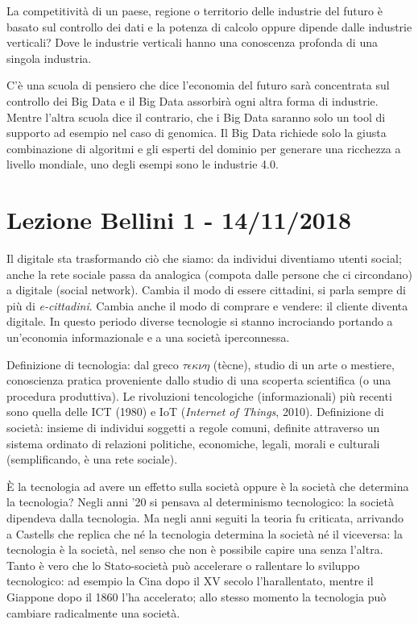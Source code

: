 \documentclass[a4page, 11pt]{article}
\begin{document}
La competitività di un paese, regione o territorio delle industrie del futuro è basato sul controllo dei dati e la potenza di calcolo oppure dipende dalle industrie verticali? Dove le industrie verticali hanno una conoscenza profonda di una singola industria.
 
C’è una scuola di pensiero che dice l’economia del futuro sarà concentrata sul controllo dei Big Data e il Big Data assorbirà ogni altra forma di industrie. Mentre l’altra scuola dice il contrario, che i Big Data saranno solo un tool di supporto ad esempio nel caso di genomica. Il Big Data richiede solo la giusta combinazione di algoritmi e gli esperti del dominio per generare una ricchezza a livello mondiale, uno degli esempi sono le industrie 4.0.

\section*{Lezione Bellini 1 - 14/11/2018}
Il digitale sta trasformando ciò che siamo: da individui diventiamo utenti social; anche la rete sociale passa da analogica (compota dalle persone che ci circondano) a digitale (social network).
Cambia il modo di essere cittadini, si parla sempre di più di \textit{e-cittadini}.
Cambia anche il modo di comprare e vendere: il cliente diventa digitale.
In questo periodo diverse tecnologie si stanno incrociando portando a un'economia informazionale e a una società iperconnessa.

Definizione di tecnologia: dal greco $\tau\epsilon\kappa\nu\eta$ (tècne), studio di un arte o mestiere, conoscienza pratica proveniente dallo studio di una scoperta scientifica (o una procedura produttiva).
Le rivoluzioni tencologiche (informazionali) più recenti sono quella delle ICT (1980) e IoT (\textit{Internet of Things}, 2010). \newline
Definizione di società: insieme di individui soggetti a regole comuni, definite attraverso un sistema ordinato di relazioni politiche, economiche, legali, morali e culturali (semplificando, è una rete sociale).

È la tecnologia ad avere un effetto sulla società oppure è la società che determina la tecnologia?
Negli anni '20 si pensava al determinismo tecnologico: la società dipendeva dalla tecnologia.
Ma negli anni seguiti la teoria fu criticata, arrivando a Castells che replica che né la tecnologia determina la società né il viceversa: la tecnologia è la società, nel senso che non è possibile capire una senza l'altra.
Tanto è vero che lo Stato-società può accelerare o rallentare lo sviluppo tecnologico: ad esempio la Cina dopo il XV secolo l'harallentato, mentre il Giappone dopo il 1860 l'ha accelerato; allo stesso momento la tecnologia può cambiare radicalmente una società.
\end{document}
